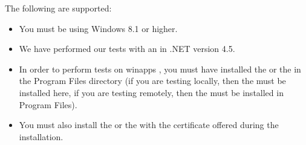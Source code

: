 The  following \gdauts{} are supported:

\begin{itemize}
\item You must be using Windows 8.1 or higher. 
\item We have performed our tests with an  \gdaut{} in .NET version 4.5.
\item In order to perform tests on winapps \gdauts{}, you must have installed the \ite{} or the \gdagent{} in the Program Files directory (if you are testing locally, then the \ite{} must be installed here, if you are testing remotely, then the \gdagent{} must be installed in Program Files). 
\item You must also install the \ite{} or the \gdagent{} with the certificate offered during the installation. 
\end{itemize}



